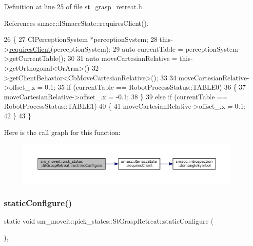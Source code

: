 Definition at line 25 of file st\+\_\+grasp\+\_\+retreat.\+h.



References smacc\+::\+I\+Smacc\+State\+::requires\+Client().


\begin{DoxyCode}
26     \{
27         ClPerceptionSystem *perceptionSystem;
28         this->\hyperlink{classsmacc_1_1ISmaccState_a7f95c9f0a6ea2d6f18d1aec0519de4ac}{requiresClient}(perceptionSystem);
29         \textcolor{keyword}{auto} currentTable = perceptionSystem->getCurrentTable();
30 
31         \textcolor{keyword}{auto} moveCartesianRelative = this->getOrthogonal<OrArm>()
32                                          ->getClientBehavior<CbMoveCartesianRelative>();
33 
34         moveCartesianRelative->offset\_.z = 0.1;
35         \textcolor{keywordflow}{if} (currentTable == RobotProcessStatus::TABLE0)
36         \{
37             moveCartesianRelative->offset\_.x = -0.1;
38         \}
39         \textcolor{keywordflow}{else} \textcolor{keywordflow}{if} (currentTable == RobotProcessStatus::TABLE1)
40         \{
41             moveCartesianRelative->offset\_.x = 0.1;
42         \}
43     \}
\end{DoxyCode}
Here is the call graph for this function\+:
\nopagebreak
\begin{figure}[H]
\begin{center}
\leavevmode
\includegraphics[width=350pt]{structsm__moveit_1_1pick__states_1_1StGraspRetreat_a1a712867a1888f96a82f19d6ccfb2a76_cgraph}
\end{center}
\end{figure}
\mbox{\label{structsm__moveit_1_1pick__states_1_1StGraspRetreat_ae80fb9ae04a037851deaa7df277dcfe8}} 
\subsubsection{\texorpdfstring{static\+Configure()}{staticConfigure()}}
{\footnotesize\ttfamily static void sm\+\_\+moveit\+::pick\+\_\+states\+::\+St\+Grasp\+Retreat\+::static\+Configure (\begin{DoxyParamCaption}{ }\end{DoxyParamCaption})\hspace{0.3cm}{\ttfamily [inline]}, {\ttfamily [static]}}



